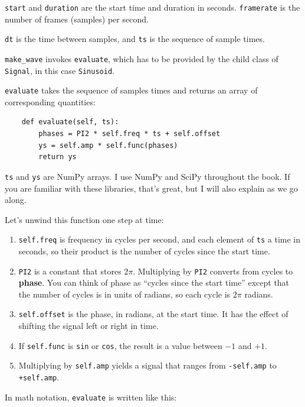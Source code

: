 \documentclass[12pt]{book}
\begin{document}
{\tt start} and {\tt duration} are the start time and duration
in seconds.  {\tt framerate} is the number of frames (samples)
per second.

{\tt dt} is the time between samples, and {\tt ts} is the sequence
of sample times.

\verb"make_wave" invokes {\tt evaluate}, which has to be provided
by the child class of {\tt Signal}, in this case {\tt Sinusoid}.

{\tt evaluate} takes the sequence of samples times and returns an array of
corresponding quantities:

\begin{verbatim}
    def evaluate(self, ts):
        phases = PI2 * self.freq * ts + self.offset
        ys = self.amp * self.func(phases)
        return ys
\end{verbatim}

{\tt ts} and {\tt ys} are NumPy arrays.  I use NumPy and SciPy
throughout the book.  If you are familiar with these libraries,
that's great, but I will also explain as we go along.

Let's unwind this function one step at time:

\begin{enumerate}

\item {\tt self.freq} is frequency in cycles per second, and
each element of {\tt ts} a time in seconds, so their product is
the number of cycles since the start time.

\item {\tt PI2} is a constant that stores $2 \pi$.  Multiplying
by {\tt PI2} converts from cycles to {\bf phase}.  You can
think of phase as ``cycles since the start time'' except that the number
of cycles is in units of radians, so each cycle is $2 \pi$ radians.

\item {\tt self.offset} is the phase, in radians, at the start time.
  It has the effect of shifting the signal left or right in time.

\item If {\tt self.func} is {\tt sin} or {\tt cos}, the result is a
  value between $-1$ and $+1$.

\item Multiplying by {\tt self.amp} yields a signal that ranges from
  {\tt -self.amp} to {\tt +self.amp}.

\end{enumerate}

In math notation, {\tt evaluate} is written like this:
\end{document}
